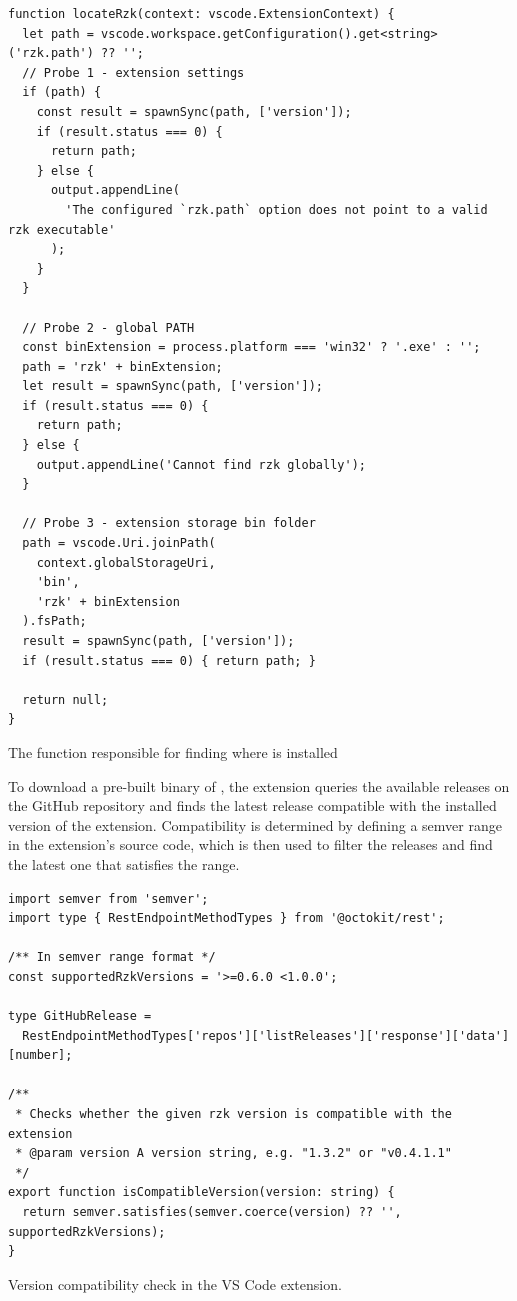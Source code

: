 \begin{listing}
  \begin{verbatim}
function locateRzk(context: vscode.ExtensionContext) {
  let path = vscode.workspace.getConfiguration().get<string>('rzk.path') ?? '';
  // Probe 1 - extension settings
  if (path) {
    const result = spawnSync(path, ['version']);
    if (result.status === 0) {
      return path;
    } else {
      output.appendLine(
        'The configured `rzk.path` option does not point to a valid rzk executable'
      );
    }
  }

  // Probe 2 - global PATH
  const binExtension = process.platform === 'win32' ? '.exe' : '';
  path = 'rzk' + binExtension;
  let result = spawnSync(path, ['version']);
  if (result.status === 0) {
    return path;
  } else {
    output.appendLine('Cannot find rzk globally');
  }

  // Probe 3 - extension storage bin folder
  path = vscode.Uri.joinPath(
    context.globalStorageUri,
    'bin',
    'rzk' + binExtension
  ).fsPath;
  result = spawnSync(path, ['version']);
  if (result.status === 0) { return path; }

  return null;
}
  \end{verbatim}
  \caption{The function responsible for finding where \Rzk{} is installed}
\end{listing}

To download a pre-built binary of \Rzk{}, the extension queries the available releases on the
GitHub repository and finds the latest release compatible with the installed version of the extension.
Compatibility is determined by defining a semver \cite{Preston2013semantic} range in the extension's source code,
which is then used to filter the releases and find the latest one that satisfies the range.

\begin{listing}
  \begin{verbatim}
import semver from 'semver';
import type { RestEndpointMethodTypes } from '@octokit/rest';

/** In semver range format */
const supportedRzkVersions = '>=0.6.0 <1.0.0';

type GitHubRelease =
  RestEndpointMethodTypes['repos']['listReleases']['response']['data'][number];

/**
 * Checks whether the given rzk version is compatible with the extension
 * @param version A version string, e.g. "1.3.2" or "v0.4.1.1"
 */
export function isCompatibleVersion(version: string) {
  return semver.satisfies(semver.coerce(version) ?? '', supportedRzkVersions);
}
  \end{verbatim}
  \caption{Version compatibility check in the VS Code extension.}
  \label{code:ext-version}
\end{listing}

